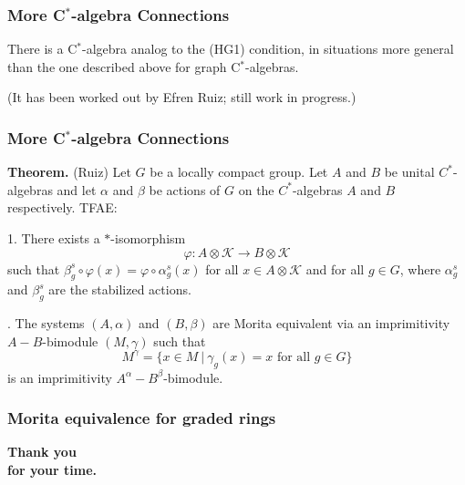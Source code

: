 \documentclass{beamer}
\begin{document}
\begin{frame}
\frametitle{More C$^*$-algebra Connections}



There is a C$^*$-algebra  analog to the (HG1) condition, in situations more general than the one described above for graph C$^*$-algebras.  


\bigskip
\bigskip

(It has been worked out by Efren Ruiz; still work in progress.)  



 \end{frame}
 




\begin{frame}
\frametitle{More C$^*$-algebra Connections}

{\bf Theorem.}  (Ruiz)  
Let $G$ be a locally compact group.  Let $A$ and $B$ be unital $C^*$-algebras and let $\alpha$ and $\beta$ be actions of $G$ on the $C^*$-algebras $A$ and $B$ respectively.  TFAE:
\bigskip

1.  There exists a $*$-isomorphism $$\varphi \colon A \otimes \mathcal{K} \to B \otimes  \mathcal{K} $$  such that 
$
\beta_g^s \circ \varphi(x) = \varphi \circ \alpha_g^s(x)
$
for all $x \in A \otimes \mathcal{K}$ and for all $g \in G$, where $\alpha_g^s$ and $\beta_g^s$ are the stabilized actions.

.  The systems $(A, \alpha)$ and $(B, \beta)$ are Morita equivalent via an imprimitivity $A-B$-bimodule $(M, \gamma)$ such that
$$
M^\gamma = \{ x \in M \ | \  \gamma_g(x)=x \text{ for all } g \in G \}
$$
is an imprimitivity $A^\alpha-B^\beta$-bimodule.





 \end{frame}













\begin{frame}
\frametitle{Morita equivalence for graded rings}



\bigskip
\bigskip

\huge
\begin{center}
{\bf Thank you \\ for your time.}
\end{center}
\normalsize

\end{frame}
\end{document}
